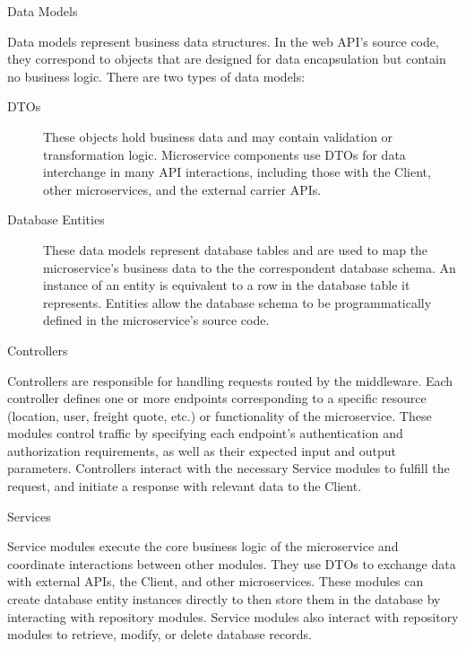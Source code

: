 \documentclass[12pt,reqno, oneside]{amsbook}
\makeatletter
\def\subsection{\@startsection{subsection}{2}%
      \z@{.5\linespacing\@plus.7\linespacing}{.25\linespacing}%
      {\normalfont\bfseries\flushleft}}
\theoremstyle{definition}
\theoremstyle{definition}
\numberwithin{section}{chapter}
\numberwithin{table}{chapter}
\numberwithin{figure}{chapter}
\makeatother
\begin{document}
\subsection{Data Models}

Data models represent business data structures. In the web \ac{API}'s source code, they correspond to objects that are designed for data encapsulation but contain no business logic. There are two types of data models:

\begin{description}
  \item[\acp{DTO}] These objects hold business data and may contain validation or transformation logic. Microservice components use \acp{DTO} for data interchange in many \ac{API} interactions, including those with the Client, other microservices, and the external carrier \acp{API}.
  \item[Database Entities] These data models represent database tables and are used to map the microservice's business data to the the correspondent database schema. An instance of an entity is equivalent to a row in the database table it represents. Entities allow the database schema to be programmatically defined in the microservice's source code.
\end{description}

\subsection{Controllers}

Controllers are responsible for handling requests routed by the middleware. Each controller defines one or more endpoints corresponding to a specific resource (location, user, freight quote, etc.) or functionality of the microservice. These modules control traffic by specifying each endpoint's authentication and authorization requirements, as well as their expected input and output parameters. Controllers interact with the necessary Service modules to fulfill the request, and initiate a response with relevant data to the Client.

\subsection{Services}

Service modules execute the core business logic of the microservice and coordinate interactions between other modules. They use \acp{DTO} to exchange data with external \acp{API}, the Client, and other microservices. These modules can create database entity instances directly to then store them in the database by interacting with repository modules. Service modules also interact with repository modules to retrieve, modify, or delete database records.
\end{document}
